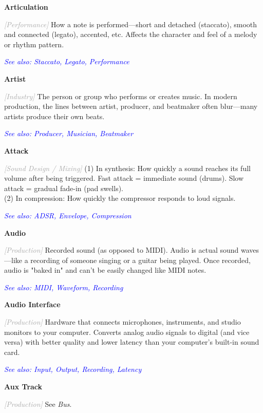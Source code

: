 \documentclass[11pt,letterpaper]{article}
\newcommand{\term}[1]{\textbf{\large\color{purple}#1}}
\newcommand{\category}[1]{\textcolor{darkgray}{\textit{\small [#1]}}}
\newcommand{\seealso}[1]{\textcolor{blue}{\textit{See also: #1}}}
\newenvironment{termdef}[1]
  {\noindent\term{#1}\par\nopagebreak}
  {\par\vspace{0.3em}}
\begin{document}
\begin{termdef}{Articulation}
\category{Performance}
How a note is performed—short and detached (staccato), smooth and connected (legato), accented, etc. Affects the character and feel of a melody or rhythm pattern.

\seealso{Staccato, Legato, Performance}
\end{termdef}

\begin{termdef}{Artist}
\category{Industry}
The person or group who performs or creates music. In modern production, the lines between artist, producer, and beatmaker often blur—many artists produce their own beats.

\seealso{Producer, Musician, Beatmaker}
\end{termdef}

\begin{termdef}{Attack}
\category{Sound Design / Mixing}
(1) In synthesis: How quickly a sound reaches its full volume after being triggered. Fast attack = immediate sound (drums). Slow attack = gradual fade-in (pad swells). \\
(2) In compression: How quickly the compressor responds to loud signals.

\seealso{ADSR, Envelope, Compression}
\end{termdef}

\begin{termdef}{Audio}
\category{Production}
Recorded sound (as opposed to MIDI). Audio is actual sound waves—like a recording of someone singing or a guitar being played. Once recorded, audio is "baked in" and can't be easily changed like MIDI notes.

\seealso{MIDI, Waveform, Recording}
\end{termdef}

\begin{termdef}{Audio Interface}
\category{Production}
Hardware that connects microphones, instruments, and studio monitors to your computer. Converts analog audio signals to digital (and vice versa) with better quality and lower latency than your computer's built-in sound card.

\seealso{Input, Output, Recording, Latency}
\end{termdef}

\begin{termdef}{Aux Track}
\category{Production}
See \textit{Bus}.
\end{termdef}

\newpage
\end{document}
